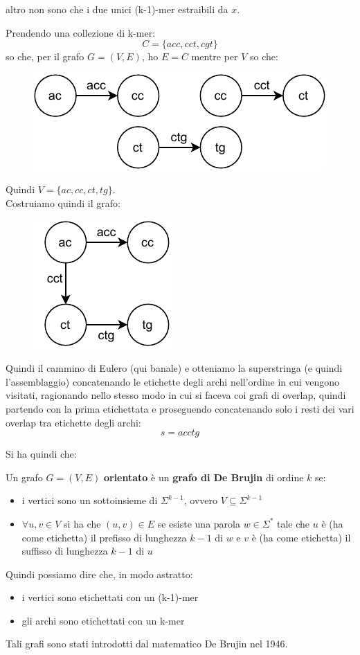 \documentclass[a4paper,12pt, oneside]{book}
\begin{document}
altro non sono che i due unici (k-1)-mer estraibili da $x$. 
\begin{esempio}
  Prendendo una collezione di k-mer:
  \[C=\{acc,cct,cgt\}\]
  so che, per il grafo $G=(V,E)$, ho $E=C$ mentre per $V$ so che:
  \begin{figure}[H]
    \centering
    \includegraphics[scale = 1]{img/gra5.pdf}
  \end{figure}
  Quindi $V=\{ac,cc,ct,tg\}$.\\
  Costruiamo quindi il grafo:
  \begin{figure}[H]
    \centering
    \includegraphics[scale = 1]{img/gra6.pdf}
  \end{figure}
  Quindi il cammino di Eulero (qui banale) e otteniamo la superstringa (e quindi
  l'assemblaggio)
  concatenando le etichette degli archi nell'ordine in cui vengono visitati,
  ragionando nello stesso modo in cui si faceva coi grafi di overlap, quindi
  partendo con la prima etichettata e proseguendo concatenando solo i resti dei
  vari overlap tra etichette degli archi:
  \[s=acctg\]
\end{esempio}
Si ha quindi che:
\begin{definizione}
  Un grafo $G=(V,E)$ \textbf{orientato} è un \textbf{grafo di De Brujin} di
  ordine $k$ se:
  \begin{itemize}
    \item i vertici sono un sottoinsieme di $\Sigma^{k-1}$, ovvero $V\subseteq
    \Sigma^{k-1}$ 
    \item $\forall u,v\in V$ si ha che $(u,v)\in E$ se esiste una parola $w\in
    \Sigma^*$ tale che $u$ è (ha come etichetta) il prefisso di lunghezza $k-1$
    di $w$ e $v$ è (ha come etichetta) il suffisso di lunghezza $k-1$ di $u$ 
  \end{itemize}
  Quindi possiamo dire che, in modo astratto:
  \begin{itemize}
    \item i vertici sono etichettati con un (k-1)-mer
    \item gli archi sono etichettati con un k-mer
  \end{itemize}
  Tali grafi sono stati introdotti dal matematico De Brujin nel 1946.
\end{definizione}
\end{document}
